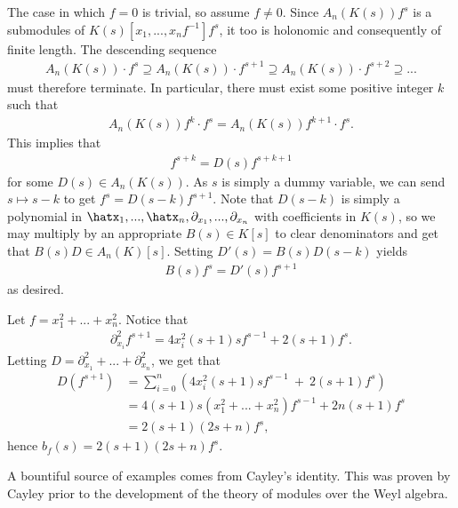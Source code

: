 \begin{prf}
	The case in which $f = 0$ is trivial, so assume $f\neq 0$. Since $A_n(K(s))f^s$ is a submodules of $K(s)[x_1,...,x_nf^{-1}]f^s$, it too is holonomic and consequently of finite length. The descending sequence
	\begin{align*}
		A_n(K(s))\cdot f^s \supseteq A_n(K(s))\cdot f^{s+1} \supseteq A_n(K(s))\cdot f^{s+2} \supseteq ...
	\end{align*}
	must therefore terminate. In particular, there must exist some positive integer $k$ such that
	\begin{align*}
		A_n(K(s))f^k\cdot f^s = A_n(K(s))f^{k+1}\cdot f^s.
	\end{align*}
	This implies that
	\begin{align*}
		f^{s+k} = D(s)f^{s+k+1}
	\end{align*}
	for some $D(s) \in A_n(K(s))$. As $s$ is simply a dummy variable, we can send $s\mapsto s - k$ to get $f^s = D(s-k)f^{s+1}$. Note that $D(s-k)$ is simply a polynomial in $\hatx_1,...,\hatx_n,\partial_{x_1},...,\partial_{x_n}$ with coefficients in $K(s)$, so we may multiply by an appropriate $B(s) \in K[s]$ to clear denominators and get that $B(s)D \in A_n(K)[s]$. Setting $D'(s) = B(s)D(s-k)$ yields
	\begin{align*}
		B(s)f^s = D'(s)f^{s+1}
	\end{align*}
	as desired.
\end{prf}
\begin{example}\label{example:b-function1}
	Let $f = x_1^2+...+x_n^2$. Notice that
	\begin{align*}
		\partial_{x_i}^2 f^{s+1} = 4x_i^2(s+1)sf^{s-1} + 2(s+1)f^s.
	\end{align*}
	Letting $D = \partial_{x_1}^2 + ... + \partial_{x_n}^2$, we get that
	\begin{align*}
		D(f^{s+1})
		  &= \sum_{i=0}^n \left(4x_i^2(s+1)sf^{s-1} ~+~ 2(s+1)f^s\right) \\
		  &= 4(s+1)s(x_1^2+...+x_n^2)f^{s-1} + 2n(s+1)f^s \\
		  &= 2(s+1)(2s+ n)f^s,
	\end{align*}
	hence $b_f(s) = 2(s+1)(2s+n)f^s$.
\end{example}
A bountiful source of examples comes from Cayley's identity. This was proven by Cayley prior to the development of the theory of modules over the Weyl algebra.
